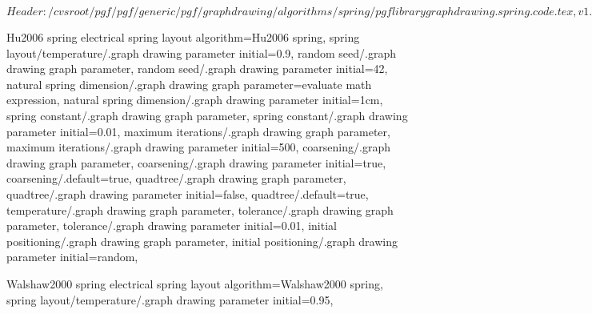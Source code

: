 %
%
%

\ProvidesFileRCS[v\pgfversion] $Header: /cvsroot/pgf/pgf/generic/pgf/graphdrawing/algorithms/spring/pgflibrarygraphdrawing.spring.code.tex,v 1.4 2011/05/09 23:12:50 jannis-pohlmann Exp $





%
% 







%
%



%
% 
%
\pgfgddeclarealgorithmkey
  {Hu2006 spring electrical}
  {spring layout}
  {
    algorithm=Hu2006 spring,
    spring layout/temperature/.graph drawing parameter initial=0.9,
  }
  {
    random seed/.graph drawing graph parameter,
    random seed/.graph drawing parameter initial=42,
    natural spring dimension/.graph drawing graph parameter=evaluate math expression,
    natural spring dimension/.graph drawing parameter initial=1cm,
    spring constant/.graph drawing graph parameter,
    spring constant/.graph drawing parameter initial=0.01,
    maximum iterations/.graph drawing graph parameter,
    maximum iterations/.graph drawing parameter initial=500,
    coarsening/.graph drawing graph parameter,
    coarsening/.graph drawing parameter initial=true,
    coarsening/.default=true,
    quadtree/.graph drawing graph parameter,
    quadtree/.graph drawing parameter initial=false,
    quadtree/.default=true,
    temperature/.graph drawing graph parameter,
    tolerance/.graph drawing graph parameter,
    tolerance/.graph drawing parameter initial=0.01,
    initial positioning/.graph drawing graph parameter,
    initial positioning/.graph drawing parameter initial=random,
  }



%
%
%
\pgfgddeclarealgorithmkey
  {Walshaw2000 spring electrical}
  {spring layout}
  {
    algorithm=Walshaw2000 spring,
    spring layout/temperature/.graph drawing parameter initial=0.95,
  }
  {}
